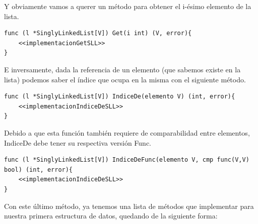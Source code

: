 \documentclass[11pt]{article}
\begin{document}
Y obviamente vamos a querer un método para obtener el i-ésimo elemento de la lista.

\begin{verbatim}
func (l *SinglyLinkedList[V]) Get(i int) (V, error){
	<<implementacionGetSLL>>
}
\end{verbatim}

E inversamente, dada la referencia de un elemento (que sabemos existe en la lista) podemos saber el índice que ocupa en la misma con el siguiente método.

\begin{verbatim}
func (l *SinglyLinkedList[V]) IndiceDe(elemento V) (int, error){
	<<implementacionIndiceDeSLL>>
}
\end{verbatim}

Debido a que esta función también requiere de comparabilidad entre elementos, IndiceDe debe tener su respectiva versión Func.

\begin{verbatim}
func (l *SinglyLinkedList[V]) IndiceDeFunc(elemento V, cmp func(V,V) bool) (int, error){
	<<implementacionIndiceDeSLL>>
}
\end{verbatim}

Con este último método, ya tenemos una lista de métodos que implementar para nuestra primera estructura de datos, quedando de la siguiente forma:
\end{document}
